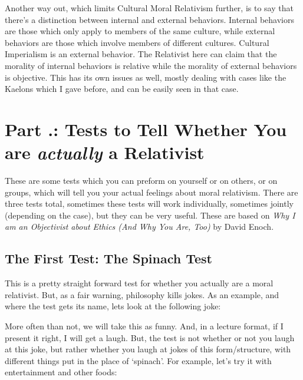 Another way out, which limits Cultural Moral Relativism further, is to say that there's a distinction between internal and external behaviors. Internal behaviors are those which only apply to members of the same culture, while external behaviors are those which involve members of different cultures. Cultural Imperialism is an external behavior. The Relativist here can claim that the morality of internal behaviors is relative while the morality of external behaviors is objective. This has its own issues as well, mostly dealing with cases like the Kaelons which I gave before, and can be easily seen in that case. 

\section{Part \thechapcount.\theseccount: Tests to Tell Whether You are \emph{actually} a Relativist}
These are some tests which you can preform on yourself or on others, or on groups, which will tell you your actual feelings about moral relativism. There are three tests total, sometimes these tests will work individually, sometimes jointly (depending on the case), but they can be very useful. These are based on \emph{Why I am an Objectivist about Ethics (And Why You Are, Too)} 
by David Enoch\autocite{Enoch1}.

\subsection{The First Test: The Spinach Test}

This is a pretty straight forward test for whether you actually are a moral relativist. But, as a fair warning, philosophy kills jokes. As an example, and where the test gets its name, lets look at the following joke:


More often than not, we will take this as funny. And, in a lecture format, if I present it right, I will get a laugh. But, the test is not whether or not you laugh at this joke, but rather whether you laugh at jokes of this form/structure, with different things put in the place of `spinach'. For example, let's try it with entertainment and other foods:



